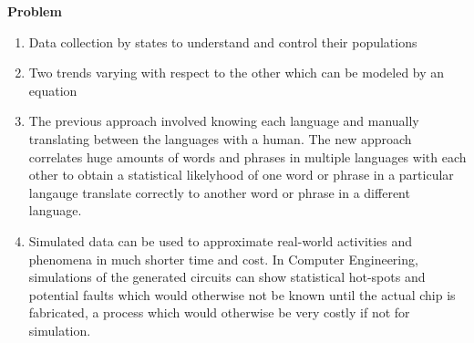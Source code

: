 \documentclass[12pt]{article}
\newenvironment{Ex}{\textbf{Problem}\vspace{.75em}\\}{}
\begin{document}
\begin{enumerate}
\begin{Ex}
\begin{solution}
\begin{enumerate}
      \item Data collection by states to understand and control their
        populations
      \item Two trends varying with respect to the other which can be
        modeled by an equation
      \item The previous approach involved knowing each language and
        manually translating between the languages with a human. The
        new approach correlates huge amounts of words and phrases in
        multiple languages with each other to obtain a statistical
        likelyhood of one word or phrase in a particular langauge
        translate correctly to another word or phrase in a different
        language.
      \item Simulated data can be used to approximate real-world
        activities and phenomena in much shorter time and cost. In
        Computer Engineering, simulations of the generated circuits
        can show statistical hot-spots and potential faults which
        would otherwise not be known until the actual chip is
        fabricated, a process which would otherwise be very costly if
        not for simulation.
      \end{enumerate}
    \end{solution}
  \end{Ex}
\end{enumerate}
\end{document}
